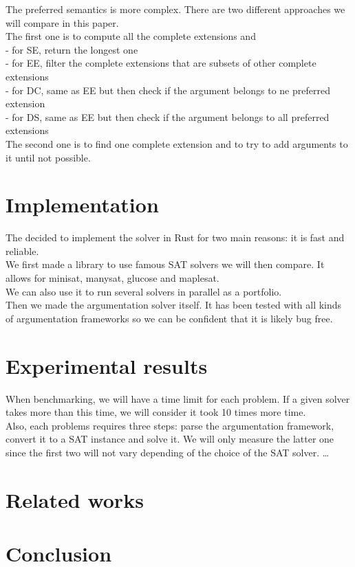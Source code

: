 \documentclass[11pt]{article}
\begin{document}
The preferred semantics is more complex. There are two different approaches we will compare in this paper. \\
The first one is to compute all the complete extensions and \\
 - for SE, return the longest one \\
 - for EE, filter the complete extensions that are subsets of other complete extensions \\
 - for DC, same as EE but then check if the argument belongs to ne preferred extension \\
 - for DS, same as EE but then check if the argument belongs to all preferred extensions \\
The second one is to find one complete extension and to try to add arguments to it until not possible.

\section{Implementation}

The decided to implement the solver in Rust for two main reasons: it is fast and reliable. \\
We first made a library\cite{portfoliolib} to use famous SAT solvers we will then compare. It allows for minisat, manysat, glucose and maplesat. \\
We can also use it to run several solvers in parallel as a portfolio. \\
Then we made the argumentation solver itself\cite{argsolver}. It has been tested with all kinds of argumentation frameworks so we can be confident that it is likely bug free.


\section{Experimental results}
When benchmarking, we will have a time limit for each problem. If a given solver takes more than this time, we will consider it took 10 times more time. \\
Also, each problems requires three steps: parse the argumentation framework, convert it to a SAT instance and solve it. We will only measure the latter one since the first two will not vary depending of the choice of the SAT solver.
\dots

\section{Related works}

\section{Conclusion}



\end{document}
